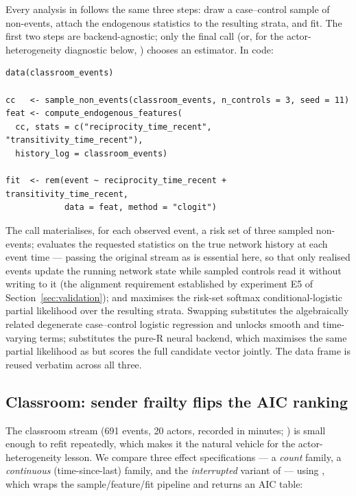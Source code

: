 Every analysis in  follows the same three steps: draw a
case--control sample of non-events, attach the endogenous statistics to the
resulting strata, and fit. The first two steps are backend-agnostic; only
the final  call (or, for the actor-heterogeneity diagnostic
below, ) chooses an estimator. In code:

\begin{verbatim}
data(classroom_events)

cc   <- sample_non_events(classroom_events, n_controls = 3, seed = 11)
feat <- compute_endogenous_features(
  cc, stats = c("reciprocity_time_recent", "transitivity_time_recent"),
  history_log = classroom_events)

fit  <- rem(event ~ reciprocity_time_recent + transitivity_time_recent,
            data = feat, method = "clogit")
\end{verbatim}

\noindent The  call materialises, for each
observed event, a risk set of three sampled non-events;  evaluates the requested statistics on the true
network history at each event time --- passing the original
stream as  is essential here, so that only realised
events update the running network state while sampled controls read it
without writing to it (the alignment requirement established by experiment
E5 of Section~\ref{sec:validation}); and  maximises the risk-set softmax conditional-logistic partial
likelihood over the resulting strata. Swapping 
substitutes the algebraically related degenerate case--control logistic
regression and unlocks  smooth and time-varying terms;
 substitutes the pure-R neural backend, which maximises
the same partial likelihood as  but scores the full candidate
vector jointly. The data frame  is reused verbatim across all
three.

\subsection{Classroom: sender frailty flips the AIC ranking}
\label{sec:illustration-classroom}

The classroom stream (691 events, 20 actors, recorded in minutes;
\citealp{McFarland2001}) is small enough to refit repeatedly, which makes it
the natural vehicle for the actor-heterogeneity lesson. We compare three
effect specifications --- a \emph{count} family, a \emph{continuous}
(time-since-last) family, and the \emph{interrupted} variant of
\citet{juozaitiene2024} --- using , which wraps the
sample/feature/fit pipeline and returns an AIC table:

